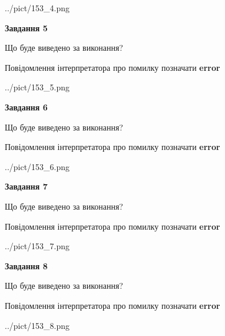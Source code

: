 \documentclass[12pt, ukrainian]{article}
\begin{document}
{\begin{center}
	{../pict/153_4.png}
\end{center}
\newpage

{\begin {center}\textbf{Завдання 5}\end {center}}\par
Що буде виведено за виконання? \par
Повідомлення інтерпретатора про помилку позначати \textbf{error}

\begin{center}
	{../pict/153_5.png}
\end{center}
\newpage

{\begin {center}\textbf{Завдання 6}\end {center}}\par
Що буде виведено за виконання? \par
Повідомлення інтерпретатора про помилку позначати \textbf{error}

\begin{center}
	{../pict/153_6.png}
\end{center}
\newpage

{\begin {center}\textbf{Завдання 7}\end {center}}\par
Що буде виведено за виконання? \par
Повідомлення інтерпретатора про помилку позначати \textbf{error}

\begin{center}
	{../pict/153_7.png}
\end{center}
\newpage

{\begin {center}\textbf{Завдання 8}\end {center}}\par
Що буде виведено за виконання? \par
Повідомлення інтерпретатора про помилку позначати \textbf{error}

\begin{center}
	{../pict/153_8.png}
\end{center}
\newpage

}
\end{document}

